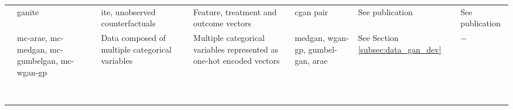 \begin{sidewaystable}[htbp]
\begin{tabularx}{\textwidth}{@{}p{3cm}XXXXXX@{}}
            \cite{Yoon2018-ite} 
            & \gls{ganite} 
            & \gls{ite}, unobserved counterfactuals 
            & Feature, treatment and outcome vectors 
            & \gls{cgan} pair 
            & See publication 
            & See publication \\
            
            \cite{Camino2018-re} 
            &\gls{mc-arae}, \gls{mc-medgan}, \gls{mc-gumbelgan}, \gls{mc-wgan-gp} 
            & Data composed of multiple categorical variables 
            & Multiple categorical variables represented as one-hot encoded vectors 
            & \gls{medgan}, \gls{wgan-gp}, \gls{gumbel-gan}, \gls{arae} 
            & See Section \ref{subsec:data_gan_dev} 
            & $-$\\
            
            \cite{mcdermott2018semi}
            &
            & 
            & 
            & 
            & 
            &\\
            
            \cite{Yoon2018-radial}
            &
            & 
            & 
            & 
            & 
            &\\
            
            \cite{yoon2018imputation}
            &
            & 
            & 
            & 
            & 
            &\\
            
            \cite{Yoon2018-ite}
            &
            & 
            & 
            & 
            & 
            &\\
            
            \cite{Wang_2019}
            &
            & 
            & 
            & 
            & 
            &\\
            
            \cite{Fisher2019}
            &
            & 
            & 
            & 
            & 
            &\\
            
            \cite{baowaly_2019_IEEE}
            &
            & 
            & 
            & 
            & 
            &\\
            
            \cite{baowaly_2019_jamia}
            &
            & 
            & 
            & 
            & 
            &\\
            

\end{tabularx}
\end{sidewaystable}
